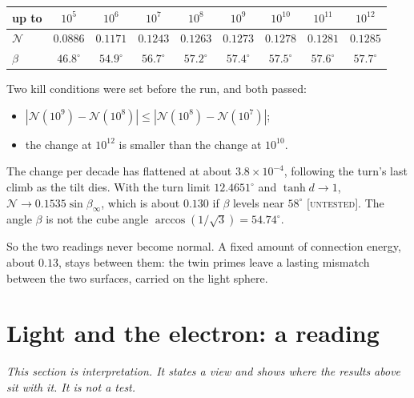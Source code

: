 \documentclass[11pt]{article}
\theoremstyle{definition}
\theoremstyle{remark}
\newcommand{\grade}[1]{\textsc{[#1]}}
\begin{document}
\begin{center}
\begin{tabular}{lcccccccc}
\toprule
up to & $10^5$ & $10^6$ & $10^7$ & $10^8$ & $10^9$ & $10^{10}$ & $10^{11}$ & $10^{12}$\\
\midrule
$\mathcal N$ & $0.0886$ & $0.1171$ & $0.1243$ & $0.1263$ & $0.1273$ & $0.1278$ & $0.1281$ & $0.1285$\\
$\beta$ & $46.8^\circ$ & $54.9^\circ$ & $56.7^\circ$ & $57.2^\circ$ & $57.4^\circ$ & $57.5^\circ$ & $57.6^\circ$ & $57.7^\circ$\\
\bottomrule
\end{tabular}
\end{center}

\noindent Two kill conditions were set before the run, and both passed:
\begin{itemize}
\item $|\mathcal N(10^9)-\mathcal N(10^8)|\le|\mathcal N(10^8)-\mathcal N(10^7)|$;
\item the change at $10^{12}$ is smaller than the change at $10^{10}$.
\end{itemize}
The change per decade has flattened at about $3.8\times10^{-4}$, following the turn's last climb as the tilt dies. With the turn limit $12.4651^\circ$ and $\tanh d\to1$, $\mathcal N\to0.1535\sin\beta_\infty$, which is about $0.130$ if $\beta$ levels near $58^\circ$ \grade{untested}. The angle $\beta$ is not the cube angle $\arccos(1/\sqrt3)=54.74^\circ$.

So the two readings never become normal. A fixed amount of connection energy, about $0.13$, stays between them: the twin primes leave a lasting mismatch between the two surfaces, carried on the light sphere.

\section{Light and the electron: a reading}

\noindent\emph{This section is interpretation. It states a view and shows where the results above sit with it. It is not a test.}
\end{document}
